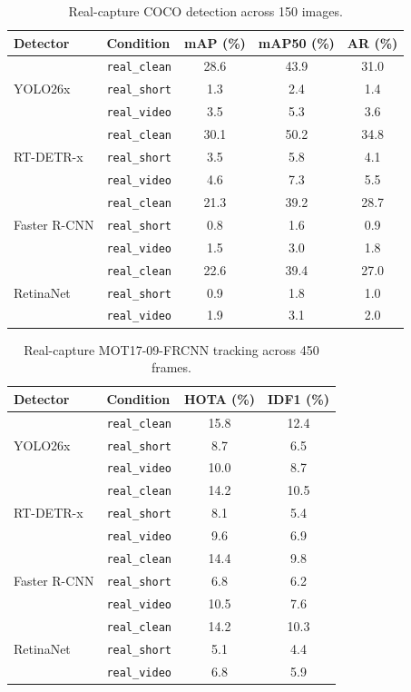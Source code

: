 \documentclass{ieeeaccess}
\begin{document}
\begin{table}[!t]
\caption{Real-capture COCO detection across 150 images.}
\label{tab:real_coco}
\centering
\footnotesize
\setlength{\tabcolsep}{5pt}
\begin{tabular}{llccc}
\toprule
Detector & Condition & mAP (\%) & mAP50 (\%) & AR (\%) \\
\midrule
\multirow{3}{*}{YOLO26x}
 & \texttt{real\_clean} & 28.6 & 43.9 & 31.0 \\
 & \texttt{real\_short} & 1.3 & 2.4 & 1.4 \\
 & \texttt{real\_video} & 3.5 & 5.3 & 3.6 \\
\midrule
\multirow{3}{*}{RT-DETR-x}
 & \texttt{real\_clean} & 30.1 & 50.2 & 34.8 \\
 & \texttt{real\_short} & 3.5 & 5.8 & 4.1 \\
 & \texttt{real\_video} & 4.6 & 7.3 & 5.5 \\
\midrule
\multirow{3}{*}{Faster R-CNN}
 & \texttt{real\_clean} & 21.3 & 39.2 & 28.7 \\
 & \texttt{real\_short} & 0.8 & 1.6 & 0.9 \\
 & \texttt{real\_video} & 1.5 & 3.0 & 1.8 \\
\midrule
\multirow{3}{*}{RetinaNet}
 & \texttt{real\_clean} & 22.6 & 39.4 & 27.0 \\
 & \texttt{real\_short} & 0.9 & 1.8 & 1.0 \\
 & \texttt{real\_video} & 1.9 & 3.1 & 2.0 \\
\bottomrule
\end{tabular}
\end{table}

\begin{table}[!t]
\caption{Real-capture MOT17-09-FRCNN tracking across 450 frames.}
\label{tab:real_mot}
\centering
\footnotesize
\begin{tabular}{llcc}
\toprule
Detector & Condition & HOTA (\%) & IDF1 (\%) \\
\midrule
\multirow{3}{*}{YOLO26x}
 & \texttt{real\_clean} & 15.8 & 12.4 \\
 & \texttt{real\_short} & 8.7 & 6.5 \\
 & \texttt{real\_video} & 10.0 & 8.7 \\
\midrule
\multirow{3}{*}{RT-DETR-x}
 & \texttt{real\_clean} & 14.2 & 10.5 \\
 & \texttt{real\_short} & 8.1 & 5.4 \\
 & \texttt{real\_video} & 9.6 & 6.9 \\
\midrule
\multirow{3}{*}{Faster R-CNN}
 & \texttt{real\_clean} & 14.4 & 9.8 \\
 & \texttt{real\_short} & 6.8 & 6.2 \\
 & \texttt{real\_video} & 10.5 & 7.6 \\
\midrule
\multirow{3}{*}{RetinaNet}
 & \texttt{real\_clean} & 14.2 & 10.3 \\
 & \texttt{real\_short} & 5.1 & 4.4 \\
 & \texttt{real\_video} & 6.8 & 5.9 \\
\bottomrule
\end{tabular}
\end{table}
\end{document}

